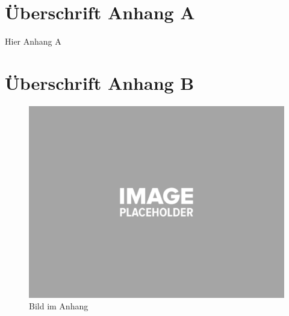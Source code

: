 \begin{appendix} 

\section*{Überschrift Anhang A} 

Hier Anhang A

\clearpage

\section*{Überschrift Anhang B} 

\begin{figure}[h]
\centering
\includegraphics[width=1.0\textwidth]{_img/placeholder_image.png}
\caption[Bild im Anhang]{Bild im Anhang}
\label{fig:pic2}
\end{figure}

\end{appendix} 

